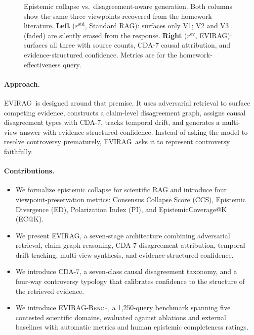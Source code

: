 \documentclass[11pt]{article}
\newcommand{\system}{\textsc{EVIRAG}\xspace}
\newcommand{\bench}{\textsc{EVIRAG-Bench}\xspace}
\begin{document}
\begin{figure}[t]
{}%
\caption{Epistemic collapse vs.\ disagreement-aware generation.
Both columns show the same three viewpoints recovered from the homework
literature.
\textbf{Left} ($r^\mathrm{std}$, Standard RAG): surfaces only V1;
V2 and V3 (faded) are silently erased from the response.
\textbf{Right} ($r^\mathrm{ev}$, \system): surfaces all three with source
counts, CDA-7 causal attribution, and evidence-structured confidence.
Metrics are for the homework-effectiveness query.}
\label{fig:collapse}
\end{figure}
\linenumbers

\paragraph{Approach.}
\system\ is designed around that premise.  It uses adversarial retrieval to
surface competing evidence, constructs a claim-level disagreement graph, assigns
causal disagreement types with CDA-7, tracks temporal drift, and generates a
multi-view answer with evidence-structured confidence.  Instead of asking the
model to resolve controversy prematurely, \system\ asks it to represent
controversy faithfully.

\paragraph{Contributions.}
\begin{itemize}[leftmargin=*,nosep]
  \item We formalize epistemic collapse for scientific RAG and introduce four
    viewpoint-preservation metrics: Consensus Collapse Score (CCS), Epistemic
    Divergence (ED), Polarization Index (PI), and EpistemicCoverage@K (EC@K).
  \item We present \system, a seven-stage architecture combining adversarial
    retrieval, claim-graph reasoning, CDA-7 disagreement attribution, temporal
    drift tracking, multi-view synthesis, and evidence-structured confidence.
  \item We introduce CDA-7, a seven-class causal disagreement taxonomy, and a
    four-way controversy typology that calibrates confidence to the structure of
    the retrieved evidence.
  \item We introduce \bench, a 1,250-query benchmark spanning five contested
    scientific domains, evaluated against ablations and external baselines with
    automatic metrics and human epistemic completeness ratings.
\end{itemize}
\end{document}
